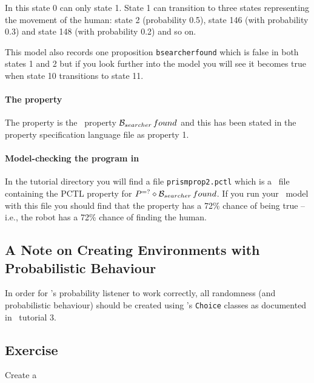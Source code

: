 \documentclass[a4]{article}
\begin{document}
In this state 0 can only state 1.  State 1 can transition to three states representing the movement of the human: state 2 (probability 0.5), state 146 (with probability 0.3) and state 148 (with probability 0.2) and so on.

This model also records one proposition \texttt{bsearcherfound} which is false in both states 1 and 2 but if you look further into the model you will see it becomes true when state 10 transitions to state 11.

\paragraph{The property} The property is the \ajpf\ property $\mathrm{{\cal B}}_{searcher} \, found$ and this has been stated in the property specification language file as property 1. 

\paragraph{Model-checking the program in \prism}  In the tutorial directory you will find a file \texttt{prismprop2.pctl} which is a \prism\ file containing the PCTL property for $P^{=?}\diamond \mathrm{{\cal B}}_{searcher} \, found$.  If you run your \prism\ model with this file you should find that the property has a 72\% chance of being true -- i.e., the robot has a 72\% chance of finding the human.

\subsection{A Note on Creating Environments with Probabilistic Behaviour}

In order for \ajpf's probability listener to work correctly, all randomness (and probabilistic behaviour) should be created using \ail's \texttt{Choice} classes as documented in \ail\ tutorial 3.

\subsection{Exercise}

Create a 


\end{document}
